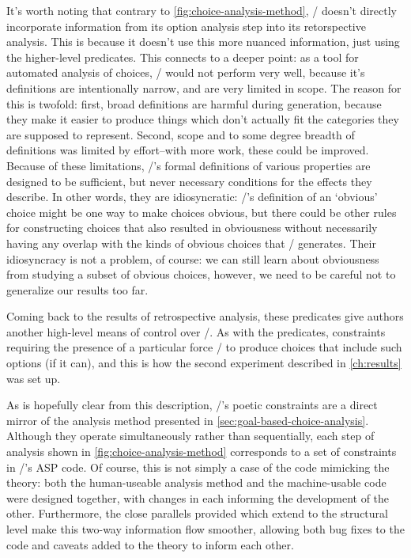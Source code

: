\begin{enumerate}
    It's worth noting that contrary to \cref{fig:choice-analysis-method}, \dunyazad/ doesn't directly incorporate information from its option analysis step into its retorspective analysis.
    This is because it doesn't use this more nuanced information, just using the higher-level  predicates.
    This connects to a deeper point: as a tool for automated analysis of choices, \dunyazad/ would not perform very well, because it's definitions are intentionally narrow, and are very limited in scope.
    The reason for this is twofold: first, broad definitions are harmful during generation, because they make it easier to produce things which don't actually fit the categories they are supposed to represent.
    Second, scope and to some degree breadth of definitions was limited by effort--with more work, these could be improved.
    Because of these limitations, \dunyazad/'s formal definitions of various properties are designed to be sufficient, but never necessary conditions for the effects they describe.
    In other words, they are idiosyncratic: \dunyazad/'s definition of an `obvious' choice might be one way to make choices obvious, but there could be other rules for constructing choices that also resulted in obviousness without necessarily having any overlap with the kinds of obvious choices that \dunyazad/ generates.
    Their idiosyncracy is not a problem, of course: we can still learn about obviousness from studying a subset of obvious choices, however, we need to be careful not to generalize our results too far.


    Coming back to the results of retrospective analysis, these  predicates give authors another high-level means of control over \dunyazad/.
    As with the  predicates, constraints requiring the presence of a particular  force \dunyazad/ to produce choices that include such options (if it can), and this is how the second experiment described in \cref{ch:results} was set up.

\end{enumerate}


As is hopefully clear from this description, \dunyazad/'s poetic constraints are a direct mirror of the analysis method presented in \cref{sec:goal-based-choice-analysis}.
%
Although they operate simultaneously rather than sequentially, each step of analysis shown in \cref{fig:choice-analysis-method} corresponds to a set of constraints in \dunyazad/'s ASP code.
%
Of course, this is not simply a case of the code mimicking the theory: both the human-useable analysis method and the machine-usable code were designed together, with changes in each informing the development of the other.
%
Furthermore, the close parallels provided which extend to the structural level make this two-way information flow smoother, allowing both bug fixes to the code and caveats added to the theory to inform each other.


